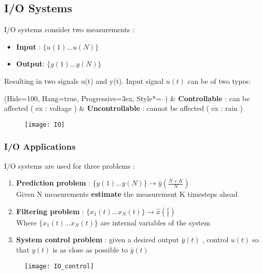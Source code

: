 \subsection{I/O Systems} %
I/O systems consider two measurements : 
\begin{itemize}
\item \textbf{Input} : $\{ u(1) ... u(N) \} $
\item \textbf{Output}: $\{ y(1) ... y(N) \} $
\end{itemize}
Resulting in two signals u(t) and y(t). 
Input signal $ u(t) $ can be of two types: 
\begin{easylist}[itemize]
\ListProperties(Hide=100, Hang=true, Progressive=3ex, Style*=--)
& \textbf{Controllable} : can be affected ( ex : voltage )
& \textbf{Uncontrollable} : cannot be affected ( ex : rain )
\end{easylist}

\begin{figure}[!h]
  \centering
  \texttt{[image: IO]}
\end{figure}

\subsubsection{I/O Applications}
I/O systems are used for three problems : 
\begin{enumerate}
\item \textbf{Prediction problem} : $\{ y(1) ... y(N) \} \rightarrow \hat{y} (\frac{N+K}{N})$ \\ Given N measurements \textbf{estimate} the measurement K timesteps ahead
\item \textbf{Filtering problem} : $\{ x_1(t) ... x_N(t) \} \rightarrow \hat{x} (\frac{t}{t})$ \\Where $\{ x_1(t) ... x_N(t) \}$ are internal variables of the system
\item \textbf{System control problem} : given a desired output $ \bar{y}(t) $ , control $ u(t) $ so that $y(t)$ is as close as possible to  $ \bar{y}(t) $
\end{enumerate}

\begin{figure}[!h]
  \centering
  \texttt{[image: IO\_control]}
\end{figure}

